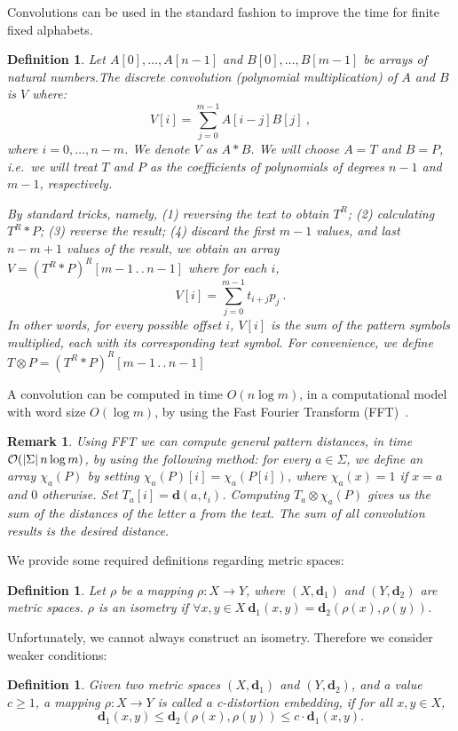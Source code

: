 \documentclass[11pt]{article}
\newcommand{\calO}{{\cal{O}}}
\newcommand{\ldotdot}{\,.\,.\,}
\newtheorem{rem}[thm]{Remark}
\newtheorem{dfn}[thm]{Definition}
\newcommand{\be}{\begin{equation}}
\newcommand{\ee}{\end{equation}}
\newcommand{\envert}[1]{\left\lvert#1\right\rvert}
\let\abs=\envert
\newcommand{\dist}{\textbf{d}}
\begin{document}
Convolutions can be used in the standard fashion to improve the time
for finite fixed alphabets.
\begin{dfn}  \label{def:FFT}
Let $A[0],\ldots ,A[n-1]$ and $B[0],\ldots ,B[m-1]$ be arrays of
natural numbers.The {\em discrete convolution (polynomial multiplication) of $A$ and
$B$} is $V$ where:
\begin{equation}
V[i] = \sum_{j=0}^{m-1} A[i-j] B[j]\ ,
\end{equation} where
$i=0,\ldots, n-m$. We denote $V$ as $A*B$. We will choose $A=T$ and
$B=P$, i.e.\ we will treat $T$ and $P$ as the coefficients of
polynomials of degrees $n-1$ and $m-1$, respectively.

By standard tricks, namely, (1) reversing the text to obtain $T^R$;
(2) calculating $T^R * P$; (3) reverse the result; (4) discard the
first $m-1$ values, and last $n-m+1$ values of the result, we obtain
an array $V = (T^R * P)^R[m-1 \ldotdot n-1]$ where for each $i$,
\begin{equation}
V[i] = \sum_{j=0}^{m-1} t_{i+j} p_j\ .
\end{equation}
In other words, for every possible offset $i$, $V[i]$ is the sum of
the pattern symbols multiplied, each with its corresponding text
symbol. For convenience, we define $T\otimes P = (T^R * P)^R[m-1
\ldotdot n-1]$
\end{dfn}
A convolution can be computed in time $O(n\log m)$, in a
computational model with word size $O(\log m)$, by using the Fast
Fourier Transform (FFT)~\cite{CLR-92}.
\begin{rem}
Using FFT we can compute general pattern distances, in time
$\calO(\abs{\Sigma} n\log m)$, by using the following method: for
every $a \in \Sigma$, we define an array $\chi_a(P)$ by setting
$\chi_a(P)[i]=\chi_a(P[i])$, where $\chi_a(x)=1$ if $x=a$ and $0$
otherwise. Set $T_a[i]=\dist(a,t_i)$. Computing $T_a \otimes
\chi_a(P)$ gives us the sum of the distances of the letter $a$ from
the text. The sum of all convolution results is the desired
distance.
\end{rem}

We provide some required definitions regarding metric spaces:
\begin{dfn}Let $\rho$ be a mapping $\rho \colon X \rightarrow Y$, where
$(X,\dist_1)$ and $(Y,\dist_2)$ are metric spaces. $\rho$ is an
\emph{isometry} if $\forall x,y \in X\
\dist_1(x,y)=\dist_2(\rho(x),\rho(y))$.
\end{dfn}
Unfortunately, we cannot always construct an isometry. Therefore we
consider weaker conditions:
\begin{dfn}
\label{def:D-emb} Given two metric spaces $(X,\dist_1)$ and
$(Y,\dist_2)$, and a value $c \geq 1$, a mapping $\rho:X \rightarrow
Y$ is called a {\em c-distortion embedding}, if for all $x,y \in X$,
\be \dist_1(x,y)\leq \dist_2(\rho(x),\rho(y))\leq
c\cdot\dist_1(x,y).
 \ee
\end{dfn}
\end{document}
